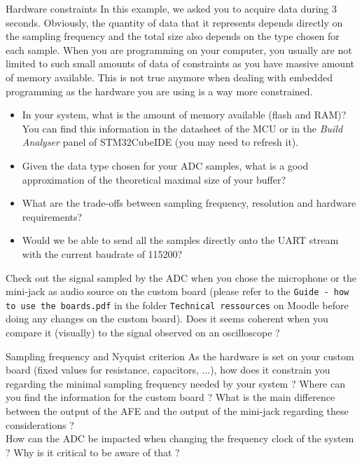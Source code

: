 \begin{bclogo}[couleur = gray!20, arrondi = 0.2, logo=\bcquestion]{Hardware constraints}
In this example, we asked you to acquire data during 3 seconds. Obviously, the quantity of data that it represents depends directly on the sampling frequency and the total size also depends on the type chosen for each sample. When you are programming on your computer, you usually are not limited to such small amounts of data of constraints as you have massive amount of memory available. This is not true anymore when dealing with embedded programming as the hardware you are using is a way more constrained.
\begin{itemize}
    \item In your system, what is the amount of memory available (flash and RAM)? You can find this information in the datasheet of the MCU or in the \textit{Build Analyser} panel of STM32CubeIDE (you may need to refresh it).
    \item Given the data type chosen for your ADC samples, what is a good approximation of the theoretical maximal size of your buffer? 
    \item What are the trade-offs between sampling frequency, resolution and hardware requirements?
    \item Would we be able to send all the samples directly onto the UART stream with the current baudrate of 115200?
\end{itemize}

\end{bclogo}

\noindent Check out the signal sampled by the ADC when you chose the microphone or the mini-jack as audio source on the custom board (please refer to the \texttt{Guide - how to use the boards.pdf} in the folder \texttt{Technical ressources} on Moodle before doing any changes on the custom board). Does it seems coherent when you compare it (visually) to the signal observed on an oscilloscope ?

\begin{bclogo}[couleur = gray!20, arrondi = 0.2, logo=\bcquestion]{Sampling frequency and Nyquist criterion}
As the hardware is set on your custom board (fixed values for resistance, capacitors, ...), how does it constrain you regarding the minimal sampling frequency needed by your system ? Where can you find the information for the custom board ? What is the main difference between the output of the AFE and the output of the mini-jack regarding these considerations ? \\

\noindent How can the ADC be impacted when changing the frequency clock of the system ? Why is it critical to be aware of that ?
\end{bclogo}
